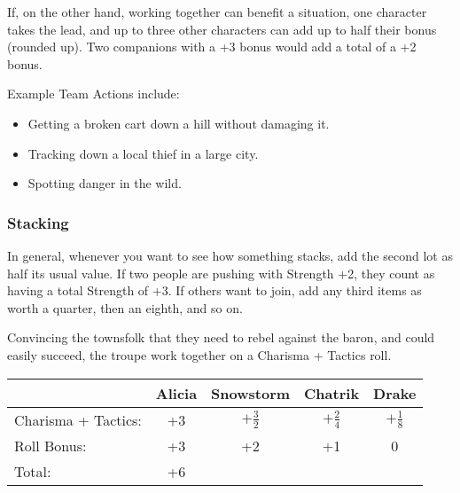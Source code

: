 \begin{multicols}{2}
If, on the other hand, working together can benefit a situation, one character takes the lead, and up to three other characters can add up to half their bonus (rounded up).
Two companions with a +3 bonus would add a total of a +2 bonus.


\begin{exampletext}
  Example Team Actions include:

  \begin{itemize}

  \item Getting a broken cart down a hill without damaging it.
  \item Tracking down a local thief in a large city.
  \item Spotting danger in the wild.

  \end{itemize}
\end{exampletext}

\subsubsection{Stacking}
\label{stacking}

In general, whenever you want to see how something stacks, add the second lot as half its usual value.
If two people are pushing with Strength +2, they count as having a total Strength of +3.
If others want to join, add any third items as worth a quarter, then an eighth, and so on.

\begin{exampletext}

Convincing the townsfolk that they need to rebel against the baron, and could easily succeed, the troupe work together on a Charisma + Tactics roll.

\end{exampletext}

\noindent%
\begin{footnotesize}%
\begin{tabularx}{\linewidth}{Y |cccc}
                    & Alicia & Snowstorm & Chatrik & Drake \\
\hline
Charisma + Tactics: & +3     & $+\frac{3}{2}$      & $+\frac{2}{4}$      & $+\frac{1}{8}$    \\
Roll Bonus:         &  +3     &     +2               &       +1             &  0 \\
\hline
Total:      &          +6 & & &\\
\end{tabularx}
\end{footnotesize}


\end{multicols}

